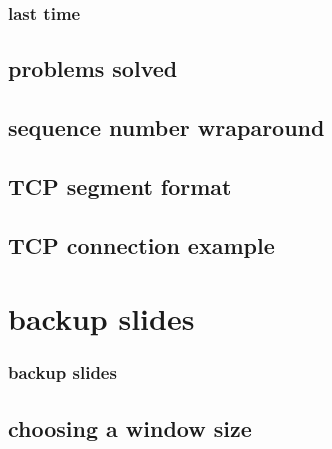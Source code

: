 \date{}
\title{}
\date{}
\usepackage{pgfplots}
\pgfplotsset{compat=1.16}

\begin{frame}
    \titlepage
\end{frame}

\begin{frame}
\frametitle{last time}
\end{frame}


\subsection{problems solved}


\subsection{sequence number wraparound}



\subsection{TCP segment format}


%

\subsection{TCP connection example}






\section{backup slides}
\begin{frame}\frametitle{backup slides}
\end{frame}
\subsection{choosing a window size}







